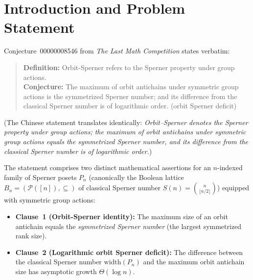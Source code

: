 \documentclass[11pt,a4paper]{article}
\theoremstyle{definition}
\newcommand{\Bn}{B_n}
\newcommand{\width}{\mathrm{width}}
\begin{document}
\section{Introduction and Problem Statement}

Conjecture~00000008546 from \emph{The Last Math Competition} states verbatim:
\begin{quote}
\textbf{Definition:} Orbit-Sperner refers to the Sperner property under group actions.\\
\textbf{Conjecture:} The maximum of orbit antichains under symmetric group actions is the symmetrized Sperner number; and its difference from the classical Sperner number is of logarithmic order. (orbit Sperner deficit)
\end{quote}
(The Chinese statement translates identically: \emph{Orbit--Sperner denotes the Sperner property under group actions; the maximum of orbit antichains under symmetric group actions equals the symmetrized Sperner number, and its difference from the classical Sperner number is of logarithmic order.})

The statement comprises two distinct mathematical assertions for an $n$-indexed family of Sperner posets $P_n$ (canonically the Boolean lattice $\Bn = (\mathcal{P}([n]), \subseteq)$ of classical Sperner number $S(n) = \binom{n}{\lfloor n/2 \rfloor}$) equipped with symmetric group actions:
\begin{itemize}
  \item \textbf{Clause~1 (Orbit-Sperner identity):} The maximum size of an orbit antichain equals the \emph{symmetrized Sperner number} (the largest symmetrized rank size).
  \item \textbf{Clause~2 (Logarithmic orbit Sperner deficit):} The difference between the classical Sperner number $\width(P_n)$ and the maximum orbit antichain size has asymptotic growth $\Theta(\log n)$.
\end{itemize}
\end{document}
